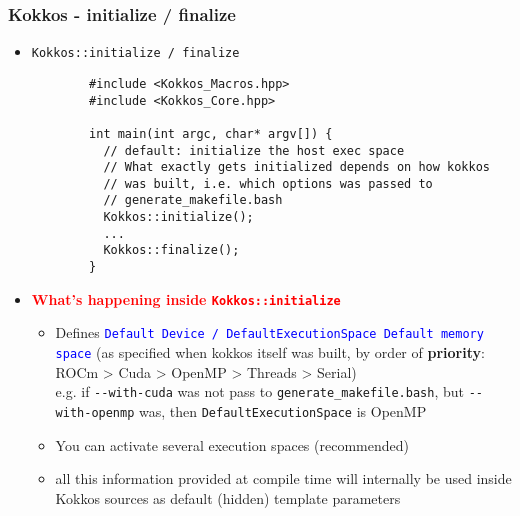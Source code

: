 \begin{frame}[fragile=singleslide]
  \frametitle{Kokkos - initialize / finalize}

  \begin{itemize}
  \item \texttt{Kokkos::initialize / finalize}
    {\small\begin{verbatim}
        #include <Kokkos_Macros.hpp>
        #include <Kokkos_Core.hpp>
        
        int main(int argc, char* argv[]) {
          // default: initialize the host exec space
          // What exactly gets initialized depends on how kokkos
          // was built, i.e. which options was passed to
          // generate_makefile.bash
          Kokkos::initialize();
          ...
          Kokkos::finalize();
        }
      \end{verbatim}
    }
  \item \textcolor{red}{\textbf{What's happening inside \texttt{Kokkos::initialize}}}
    \begin{itemize}
    \item Defines \textcolor{blue}{\texttt{Default Device / DefaultExecutionSpace Default memory space}} (as specified when kokkos itself was built, by order of {\bf priority}: ROCm > Cuda > OpenMP > Threads > Serial)\\
      e.g. if \texttt{\--\--with-cuda} was not pass to \texttt{generate\_makefile.bash}, but \texttt{\--\--with-openmp} was, then \texttt{DefaultExecutionSpace} is OpenMP
    \item You can activate several execution spaces (recommended)
    \item all this information provided at compile time will internally be used inside Kokkos sources as default (hidden) template parameters
    \end{itemize}
  \end{itemize}
\end{frame}

